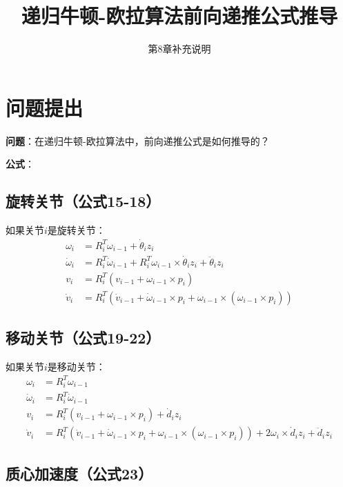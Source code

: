 \documentclass[12pt,a4paper]{article}
\title{递归牛顿-欧拉算法前向递推公式推导}
\author{第8章补充说明}
\date{}
\begin{document}
\maketitle

\section{问题提出}

\textbf{问题}：在递归牛顿-欧拉算法中，前向递推公式是如何推导的？

\textbf{公式}：

\subsection{旋转关节（公式15-18）}

如果关节$i$是旋转关节：
\begin{align}
\omega_i &= R_i^T \omega_{i-1} + \dot{\theta}_i z_i \tag{15} \\
\dot{\omega}_i &= R_i^T \dot{\omega}_{i-1} + R_i^T \omega_{i-1} \times \dot{\theta}_i z_i + \ddot{\theta}_i z_i \tag{16} \\
v_i &= R_i^T (v_{i-1} + \omega_{i-1} \times p_i) \tag{17} \\
\dot{v}_i &= R_i^T (\dot{v}_{i-1} + \dot{\omega}_{i-1} \times p_i + \omega_{i-1} \times (\omega_{i-1} \times p_i)) \tag{18}
\end{align}

\subsection{移动关节（公式19-22）}

如果关节$i$是移动关节：
\begin{align}
\omega_i &= R_i^T \omega_{i-1} \tag{19} \\
\dot{\omega}_i &= R_i^T \dot{\omega}_{i-1} \tag{20} \\
v_i &= R_i^T (v_{i-1} + \omega_{i-1} \times p_i) + \dot{d}_i z_i \tag{21} \\
\dot{v}_i &= R_i^T (\dot{v}_{i-1} + \dot{\omega}_{i-1} \times p_i + \omega_{i-1} \times (\omega_{i-1} \times p_i)) + 2\omega_i \times \dot{d}_i z_i + \ddot{d}_i z_i \tag{22}
\end{align}

\subsection{质心加速度（公式23）}
\end{document}
